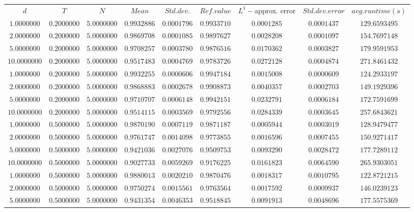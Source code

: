 \begin{tabular}{ccccccccc}
$d$ & $T$ & $N$ & $Mean$ & $Std. dev.$ & $Ref. value$ & $L^1-$approx. error & $Std. dev. error$ & $avg. runtime (s)$\\
$1.0000000$ & $0.2000000$ & $5.0000000$ & $0.9932886$ & $0.0001796$ & $0.9933710$ & $0.0001285$ & $0.0001437$ & $129.6593495$\\
$2.0000000$ & $0.2000000$ & $5.0000000$ & $0.9869708$ & $0.0001085$ & $0.9897627$ & $0.0028208$ & $0.0001097$ & $154.7697148$\\
$5.0000000$ & $0.2000000$ & $5.0000000$ & $0.9708257$ & $0.0003780$ & $0.9876516$ & $0.0170362$ & $0.0003827$ & $179.9591953$\\
$10.0000000$ & $0.2000000$ & $5.0000000$ & $0.9517483$ & $0.0004769$ & $0.9783726$ & $0.0272128$ & $0.0004874$ & $271.8461432$\\
$1.0000000$ & $0.2000000$ & $5.0000000$ & $0.9932255$ & $0.0000606$ & $0.9947184$ & $0.0015008$ & $0.0000609$ & $124.2933197$\\
$2.0000000$ & $0.2000000$ & $5.0000000$ & $0.9868883$ & $0.0002678$ & $0.9908873$ & $0.0040357$ & $0.0002703$ & $149.1929396$\\
$5.0000000$ & $0.2000000$ & $5.0000000$ & $0.9710707$ & $0.0006148$ & $0.9942151$ & $0.0232791$ & $0.0006184$ & $172.7591699$\\
$10.0000000$ & $0.2000000$ & $5.0000000$ & $0.9514115$ & $0.0003569$ & $0.9792556$ & $0.0284339$ & $0.0003645$ & $257.6843621$\\
$1.0000000$ & $0.5000000$ & $5.0000000$ & $0.9870190$ & $0.0007119$ & $0.9871187$ & $0.0005944$ & $0.0003019$ & $128.9479477$\\
$2.0000000$ & $0.5000000$ & $5.0000000$ & $0.9761747$ & $0.0014098$ & $0.9773855$ & $0.0016596$ & $0.0007455$ & $150.9271417$\\
$5.0000000$ & $0.5000000$ & $5.0000000$ & $0.9421036$ & $0.0027076$ & $0.9509753$ & $0.0093290$ & $0.0028472$ & $177.7289112$\\
$10.0000000$ & $0.5000000$ & $5.0000000$ & $0.9027733$ & $0.0059269$ & $0.9176225$ & $0.0161823$ & $0.0064590$ & $265.9303051$\\
$1.0000000$ & $0.5000000$ & $5.0000000$ & $0.9880013$ & $0.0020210$ & $0.9870476$ & $0.0018317$ & $0.0010795$ & $122.8721215$\\
$2.0000000$ & $0.5000000$ & $5.0000000$ & $0.9750274$ & $0.0015561$ & $0.9763564$ & $0.0017592$ & $0.0009937$ & $146.0239123$\\
$5.0000000$ & $0.5000000$ & $5.0000000$ & $0.9431354$ & $0.0046353$ & $0.9518845$ & $0.0091913$ & $0.0048696$ & $177.5575369$\\

\end{tabular}
